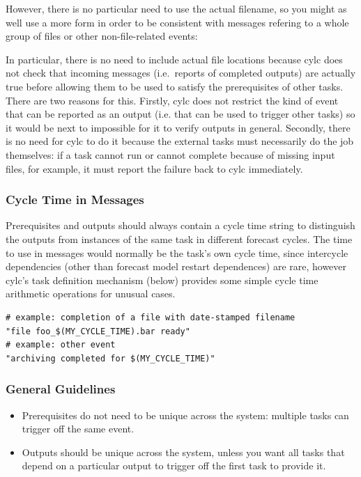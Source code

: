 \documentclass[11pt,a4paper]{article}
\begin{document}
However, there is no particular need to use the actual filename, 
so you might as well use a more form in order to be consistent with
messages refering to a whole group of files or other non-file-related
events:

In particular, there is no need to include actual file locations because
cylc does not check that incoming messages (i.e.\ reports of completed
outputs) are actually true before allowing them to be used to satisfy
the prerequisites of other tasks. There are two reasons for this.
Firstly, cylc does not restrict the kind of event that can be reported
as an output (i.e. that can be used to trigger other tasks) so it would
be next to impossible for it to verify outputs in general. Secondly, 
there is no need for cylc to do it because the external tasks must
necessarily do the job themselves: if a task cannot run or cannot
complete because of missing input files, for example, it must report the
failure back to cylc immediately.


\subsubsection{Cycle Time in Messages}

Prerequisites and outputs should always contain a cycle time string to
distinguish the outputs from instances of the same task in different
forecast cycles. The time to use in messages would normally be the
task's own cycle time, since intercycle dependencies (other than
forecast model restart dependences) are rare, however cylc's task
definition mechanism (below) provides some simple cycle time arithmetic
operations for unusual cases. 

\lstset{language=Python}
\begin{lstlisting}
# example: completion of a file with date-stamped filename
"file foo_$(MY_CYCLE_TIME).bar ready"
# example: other event
"archiving completed for $(MY_CYCLE_TIME)"
\end{lstlisting}


\subsubsection{General Guidelines}

\begin{itemize}

    \item Prerequisites do not need to be unique across the system:
        multiple tasks can trigger off the same event.

    \item Outputs should be unique across the system, unless you want
        all tasks that depend on a particular output to trigger off the
        first task to provide it.

\end{itemize}
\end{document}
